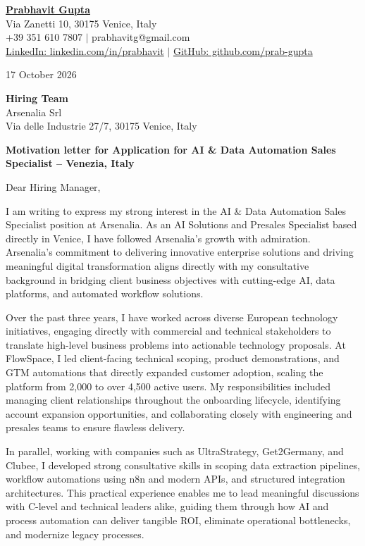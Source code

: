 \documentclass[10pt,a4paper]{article}
\begin{document}
\begin{flushleft}
\textbf{\underline{Prabhavit Gupta}}\\
Via Zanetti 10, 30175 Venice, Italy\\
+39 351 610 7807 $|$ prabhavitg@gmail.com\\
\href{https://www.linkedin.com/in/prabhavit/}{LinkedIn: linkedin.com/in/prabhavit} $|$ \href{https://github.com/prab-gupta}{GitHub: github.com/prab-gupta}
\end{flushleft}

\vspace{0.5em}
17 October 2026

\vspace{0.5em}
\textbf{Hiring Team}\\
Arsenalia Srl\\
Via delle Industrie 27/7, 30175 Venice, Italy

\vspace{0.5em}
\textbf{Motivation letter for Application for AI \& Data Automation Sales Specialist -- Venezia, Italy}

\vspace{0.5em}
Dear Hiring Manager,

I am writing to express my strong interest in the AI \& Data Automation Sales Specialist position at Arsenalia. As an AI Solutions and Presales Specialist based directly in Venice, I have followed Arsenalia's growth with admiration. Arsenalia's commitment to delivering innovative enterprise solutions and driving meaningful digital transformation aligns directly with my consultative background in bridging client business objectives with cutting-edge AI, data platforms, and automated workflow solutions.

Over the past three years, I have worked across diverse European technology initiatives, engaging directly with commercial and technical stakeholders to translate high-level business problems into actionable technology proposals. At FlowSpace, I led client-facing technical scoping, product demonstrations, and GTM automations that directly expanded customer adoption, scaling the platform from 2,000 to over 4,500 active users. My responsibilities included managing client relationships throughout the onboarding lifecycle, identifying account expansion opportunities, and collaborating closely with engineering and presales teams to ensure flawless delivery.

In parallel, working with companies such as UltraStrategy, Get2Germany, and Clubee, I developed strong consultative skills in scoping data extraction pipelines, workflow automations using n8n and modern APIs, and structured integration architectures. This practical experience enables me to lead meaningful discussions with C-level and technical leaders alike, guiding them through how AI and process automation can deliver tangible ROI, eliminate operational bottlenecks, and modernize legacy processes.
\end{document}
